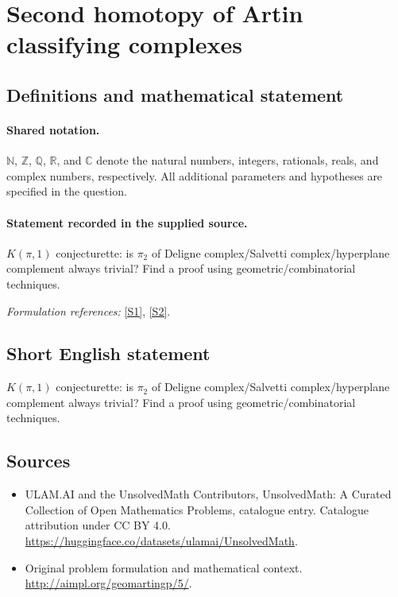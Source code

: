 \documentclass[11pt]{article}
\newcommand{\sref}[2]{\hyperlink{source:#1:#2}{[S#2]}}
\begin{document}
\section{Second homotopy of Artin classifying complexes}\label{statement}

\subsection{Definitions and mathematical statement}

\paragraph{Shared notation.}$\mathbb N$, $\mathbb Z$, $\mathbb Q$, $\mathbb R$, and $\mathbb C$ denote the natural numbers, integers, rationals, reals, and complex numbers, respectively. All additional parameters and hypotheses are specified in the question.


\paragraph{Statement recorded in the supplied source.}
$K(\pi,1)$ conjecturette: is $\pi_2$ of Deligne complex/Salvetti complex/hyperplane complement always trivial? Find a proof using geometric/combinatorial techniques.
\par\smallskip\textit{Formulation references:} \sref{statement}{1}, \sref{statement}{2}.
\subsection{Short English statement}
$K(\pi,1)$ conjecturette: is $\pi_2$ of Deligne complex/Salvetti complex/hyperplane complement always trivial? Find a proof using geometric/combinatorial techniques.
\subsection{Sources}
\begin{itemize}
\item[\hypertarget{source:statement:1}{S1}] ULAM.AI and the UnsolvedMath Contributors, UnsolvedMath: A Curated Collection of Open Mathematics Problems, catalogue entry. Catalogue attribution under CC BY 4.0.
\url{https://huggingface.co/datasets/ulamai/UnsolvedMath}.
\item[\hypertarget{source:statement:2}{S2}] Original problem formulation and mathematical context.
\url{http://aimpl.org/geomartingp/5/}.
\end{itemize}
\label{end:statement}
\end{document}

